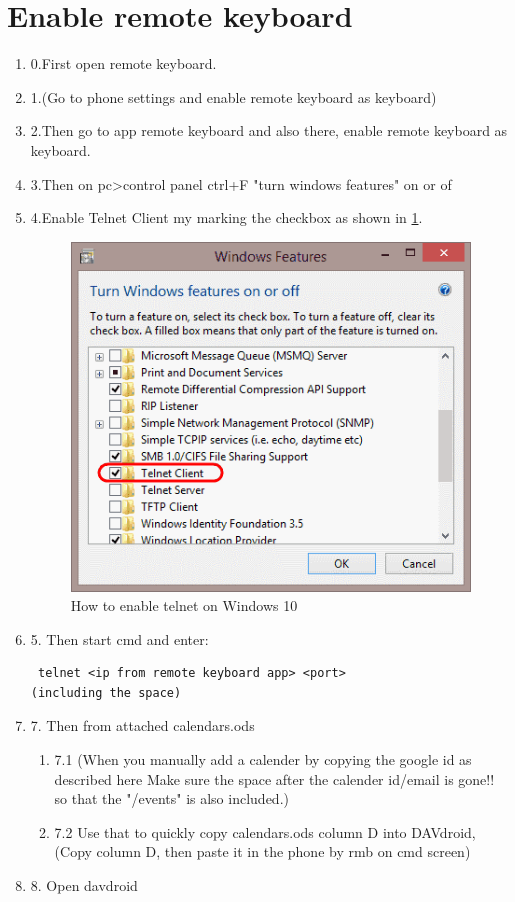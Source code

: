 \section{Enable remote keyboard}\label{sec:remote_keyboard}
\begin{enumerate}
    \item 0.First open remote keyboard.
\item 1.(Go to phone settings and enable remote keyboard as keyboard)
\item 2.Then go to app remote keyboard and also there, enable remote keyboard as keyboard.
\item 3.Then on pc>control panel ctrl+F "turn windows features" on or of 
\item 4.Enable Telnet Client my marking the checkbox as shown in \cref{fig:remote_keyboard}.
\begin{figure}[H]
    \centering
    \includegraphics{images/remoteKeyboard.png}
    \caption{How to enable telnet on Windows 10}
    \label{fig:remote_keyboard}
\end{figure}
\item 5. Then start cmd and enter:
\begin{verbatim}
 telnet <ip from remote keyboard app> <port>
(including the space)
\end{verbatim}
\item 7. Then from attached calendars.ods 
    \begin{enumerate}
        \item 7.1 (When you manually add a calender by copying the google id as described here Make            sure the space after the calender id/email is gone!! so that the "/events" is also                        included.)
        \item 7.2 Use that to quickly copy calendars.ods column D into DAVdroid, (Copy column D, then paste it in the phone by rmb on cmd screen)
    \end{enumerate}
    \item 8. Open davdroid
\end{enumerate}





